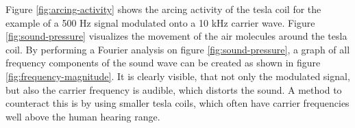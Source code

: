 Figure \ref{fig:arcing-activity} shows the arcing activity of the tesla coil for the example of a 500 Hz signal modulated onto a 10 kHz carrier wave. Figure \ref{fig:sound-pressure} visualizes the movement of the air molecules around the tesla coil. By performing a Fourier analysis on figure \ref{fig:sound-pressure}, a graph of all frequency components of the sound wave can be created as shown in figure \ref{fig:frequency-magnitude}. It is clearly visible, that not only the modulated signal, but also the carrier frequency is audible, which distorts the sound. A method to counteract this is by using smaller tesla coils, which often have carrier frequencies well above the human hearing range.

\begin{figure}[h!]
\end{figure}
